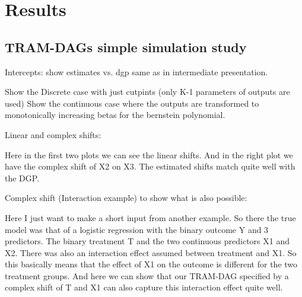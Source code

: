 

\chapter{Results}



\section{TRAM-DAGs simple simulation study}

Intercepts: show estimates vs. dgp same as in intermediate presentation.

Show the Discrete case with just cutpints (only K-1 parameters of outputs are used)
Show the continuous case where the outputs are transformed to monotonically increasing betas for the bernstein polynomial.

Linear and complex shifts: 

Here in the first two plots we can see the linear shifts. And in the right plot we have the complex shift of X2 on X3. The estimated shifts match quite well with the DGP.

Complex shift (Interaction example) to show what is also possible:

Here I just want to make a short input from another example. So there the true model was that of a logistic regression with the binary outcome Y and 3 predictors. The binary treatment T and the two continuous predictors X1 and X2. There was also an interaction effect assumed between treatment and X1. So this basically means that the effect of X1 on the outcome is different for the two treatment groups.
And here we can show that our TRAM-DAG specified by a complex shift of T and X1 can also capture this interaction effect quite well.




